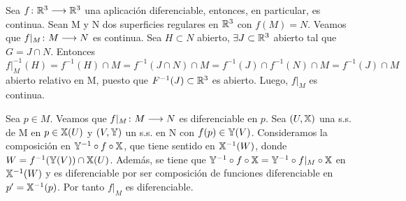 \documentclass[GAP.tex]{subfiles}
\begin{document}
\begin{dem}[Teorema 10] Sea $f\colon{\mathbb{R}^3}\longrightarrow{\mathbb{R}^3}$ una aplicación diferenciable, entonces, en particular, es continua. Sean M y N dos superficies regulares en $\mathbb{R}^3$ con $f(M)=N$. Veamos que $f|_M\colon{M}\longrightarrow{N}$ es continua. Sea $H\subset N$ abierto, $\exists J\subset \mathbb{R}^3$ abierto tal que $G=J\cap N$. Entonces $f|_M^{-1}(H) = f^{-1}(H)\cap M = f^{-1}(J\cap N)\cap M=f^{-1}(J)\cap f^{-1}(N)\cap M = f^{-1}(J)\cap M$ abierto relativo en M, puesto que $F^{-1}(J)\subset \mathbb{R}^3$ es abierto. Luego, $f|_M$ es continua.\QED

Sea $p\in M$. Veamos que $f|_M\colon{M}\longrightarrow{N}$ es diferenciable en $p$. Sea $(U,\mathbb{X})$ una s.s. de M en $p\in\mathbb{X}(U)$ y $(V,\mathbb{Y})$ un s.s. en N con $f(p)\in\mathbb{Y}(V)$. Consideramos la composición en $\mathbb{Y}^{-1}\circ f \circ \mathbb{X}$, que tiene sentido en $\mathbb{X}^{-1}(W)$, donde $W = f^{-1}(\mathbb{Y}(V))\cap \mathbb{X}(U)$. Además, se tiene que $\mathbb{Y}^{-1}\circ f \circ \mathbb{X} = \mathbb{Y}^{-1}\circ f|_M \circ \mathbb{X}$ en $\mathbb{X}^{-1}(W)$ y es diferenciable por ser composición de funciones diferenciable en $p'=\mathbb{X}^{-1}(p)$. Por tanto $f|_M$ es diferenciable.\QED
\end{dem}
\end{document}
